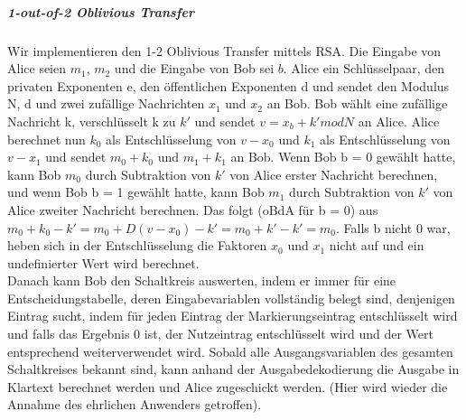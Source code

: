\documentclass{article}
\begin{document}
\subparagraph{1-out-of-2 Oblivious Transfer} \label{12ot}
Wir implementieren den 1-2 Oblivious Transfer mittels RSA. Die Eingabe
von Alice seien \(m_1\), \(m_2\) und die Eingabe von Bob sei \(b\).
Alice ein Schl\"usselpaar, den privaten Exponenten e, den
\"offentlichen Exponenten d und sendet den Modulus N, d und zwei zuf\"allige
Nachrichten \(x_1\) und \(x_2\) an Bob. Bob w\"ahlt eine zuf\"allige Nachricht
k, verschl\"usselt k zu \(k'\) und sendet \(v = x_b + k' mod N\) an Alice. 
Alice berechnet nun \(k_0\) als Entschl\"usselung von \(v - x_0\) und 
\(k_1\) als Entschl\"usselung von \(v - x_1\) und sendet \(m_0 + k_0\) und
\(m_1 + k_1\) an Bob. Wenn Bob b = 0 gew\"ahlt hatte, kann Bob \(m_0\)
durch Subtraktion von \(k'\) von Alice erster Nachricht berechnen, und wenn
Bob b = 1 gew\"ahlt hatte, kann Bob \(m_1\) durch Subtraktion von \(k'\) von
Alice zweiter Nachricht berechnen. Das folgt (oBdA f\"ur b = 0) aus
\(m_0 + k_0 - k' = m_0 + D(v - x_0) - k' = m_0 + k' - k' = m_0\). Falls b 
nicht 0 war, heben sich in der Entschl\"usselung die Faktoren \(x_0\) und
\(x_1\) nicht auf und ein undefinierter Wert wird berechnet. \\
Danach kann Bob den Schaltkreis auswerten, indem er immer f\"ur eine 
Entscheidungstabelle, deren Eingabevariablen vollst\"andig belegt sind,
denjenigen Eintrag sucht, indem f\"ur jeden Eintrag der Markierungseintrag
entschl\"usselt wird und falls das Ergebnis 0 ist, der Nutzeintrag
entschl\"usselt wird und der Wert entsprechend weiterverwendet wird. Sobald
alle Ausgangsvariablen des gesamten Schaltkreises bekannt sind, kann anhand
der Ausgabedekodierung die Ausgabe in Klartext berechnet werden und Alice 
zugeschickt werden. (Hier wird wieder die Annahme des ehrlichen Anwenders
getroffen).
\end{document}
